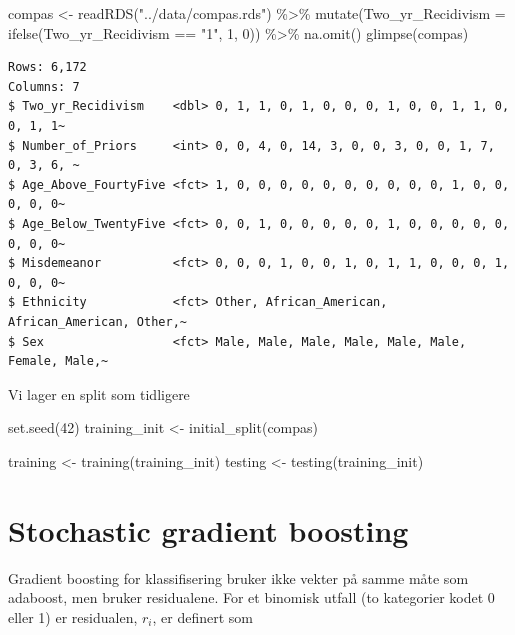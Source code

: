 \documentclass[
  letterpaper,
  DIV=11,
  numbers=noendperiod]{scrreprt}
\newenvironment{Shaded}{\begin{snugshade}}{\end{snugshade}}
\newcommand{\AttributeTok}[1]{\textcolor[rgb]{0.40,0.45,0.13}{#1}}
\newcommand{\DecValTok}[1]{\textcolor[rgb]{0.68,0.00,0.00}{#1}}
\newcommand{\FunctionTok}[1]{\textcolor[rgb]{0.28,0.35,0.67}{#1}}
\newcommand{\NormalTok}[1]{\textcolor[rgb]{0.00,0.23,0.31}{#1}}
\newcommand{\OtherTok}[1]{\textcolor[rgb]{0.00,0.23,0.31}{#1}}
\newcommand{\SpecialCharTok}[1]{\textcolor[rgb]{0.37,0.37,0.37}{#1}}
\newcommand{\StringTok}[1]{\textcolor[rgb]{0.13,0.47,0.30}{#1}}
\begin{document}
\begin{Shaded}
\begin{Highlighting}[]
\NormalTok{compas }\OtherTok{\textless{}{-}} \FunctionTok{readRDS}\NormalTok{(}\StringTok{"../data/compas.rds"}\NormalTok{) }\SpecialCharTok{\%\textgreater{}\%} 
  \FunctionTok{mutate}\NormalTok{(}\AttributeTok{Two\_yr\_Recidivism =} \FunctionTok{ifelse}\NormalTok{(Two\_yr\_Recidivism }\SpecialCharTok{==} \StringTok{"1"}\NormalTok{, }\DecValTok{1}\NormalTok{, }\DecValTok{0}\NormalTok{)) }\SpecialCharTok{\%\textgreater{}\%} 
  \FunctionTok{na.omit}\NormalTok{()}
\FunctionTok{glimpse}\NormalTok{(compas)}
\end{Highlighting}
\end{Shaded}

\begin{verbatim}
Rows: 6,172
Columns: 7
$ Two_yr_Recidivism    <dbl> 0, 1, 1, 0, 1, 0, 0, 0, 1, 0, 0, 1, 1, 0, 0, 1, 1~
$ Number_of_Priors     <int> 0, 0, 4, 0, 14, 3, 0, 0, 3, 0, 0, 1, 7, 0, 3, 6, ~
$ Age_Above_FourtyFive <fct> 1, 0, 0, 0, 0, 0, 0, 0, 0, 0, 0, 1, 0, 0, 0, 0, 0~
$ Age_Below_TwentyFive <fct> 0, 0, 1, 0, 0, 0, 0, 0, 1, 0, 0, 0, 0, 0, 0, 0, 0~
$ Misdemeanor          <fct> 0, 0, 0, 1, 0, 0, 1, 0, 1, 1, 0, 0, 0, 1, 0, 0, 0~
$ Ethnicity            <fct> Other, African_American, African_American, Other,~
$ Sex                  <fct> Male, Male, Male, Male, Male, Male, Female, Male,~
\end{verbatim}

Vi lager en split som tidligere

\begin{Shaded}
\begin{Highlighting}[]
\FunctionTok{set.seed}\NormalTok{(}\DecValTok{42}\NormalTok{)}
\NormalTok{training\_init }\OtherTok{\textless{}{-}} \FunctionTok{initial\_split}\NormalTok{(compas)}

\NormalTok{training }\OtherTok{\textless{}{-}} \FunctionTok{training}\NormalTok{(training\_init)}
\NormalTok{testing  }\OtherTok{\textless{}{-}} \FunctionTok{testing}\NormalTok{(training\_init)}
\end{Highlighting}
\end{Shaded}

\section{Stochastic gradient
boosting}\label{stochastic-gradient-boosting}

Gradient boosting for klassifisering bruker ikke vekter på samme måte
som adaboost, men bruker residualene. For et binomisk utfall (to
kategorier kodet 0 eller 1) er residualen, \(r_i\), er definert som
\end{document}
